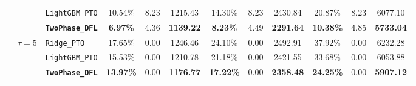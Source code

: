 \documentclass[11pt,a4paper]{article}
\theoremstyle{definition}
\theoremstyle{remark}
\begin{document}
\begin{table}[H]
{\begin{tabular}{@{}lllccccccccc@{}}
 & & \texttt{LightGBM\_PTO} & 10.54\% & 8.23 & 1215.43 & 14.30\% & 8.23 & 2430.84 & 20.87\% & 8.23 & 6077.10 \\
 & & \textbf{\texttt{TwoPhase\_DFL}} & \textbf{6.97\%} & 4.36 & \textbf{1139.22} & \textbf{8.23\%} & 4.49 & \textbf{2291.64} & \textbf{10.38\%} & 4.85 & \textbf{5733.04} \\
\cmidrule(lr){2-12}
 & \multirow{3}{*}{$\tau = 5$}
 & \texttt{Ridge\_PTO} & 17.65\% & 0.00 & 1246.46 & 24.10\% & 0.00 & 2492.91 & 37.92\% & 0.00 & 6232.28 \\
 & & \texttt{LightGBM\_PTO} & 15.53\% & 0.00 & 1210.78 & 21.18\% & 0.00 & 2421.55 & 33.68\% & 0.00 & 6053.88 \\
 & & \textbf{\texttt{TwoPhase\_DFL}} & \textbf{13.97\%} & 0.00 & \textbf{1176.77} & \textbf{17.22\%} & 0.00 & \textbf{2358.48} & \textbf{24.25\%} & 0.00 & \textbf{5907.12} \\
\bottomrule
\end{tabular}%
}
\end{table}
\end{document}
